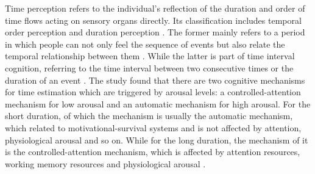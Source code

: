 \documentclass[sigconf]{acmart}
\begin{document}

Time perception refers to the individual's reflection of the duration and order of time flows acting on sensory organs directly. Its classification includes temporal order perception and duration perception \cite{宋其争2004时间认知的理论模型探析}. The former mainly refers to a period in which people can not only feel the sequence of events but also relate the temporal relationship between them \cite{张义芳2011时间知觉的影响因素研究综述}. While the latter is part of time interval cognition, referring to the time interval between two consecutive times or the duration of an event \cite{赵雪2012时距知觉研究综述}. The study found that there are two cognitive mechanisms for time estimation which are triggered by arousal levels: a controlled-attention mechanism for low arousal and an automatic mechanism for high arousal. For the short duration, of which the mechanism is usually the  automatic mechanism, which related to motivational-survival systems and is not affected by attention, physiological arousal and so on. While for the long duration, the mechanism of it is the controlled-attention mechanism, which is affected by attention resources, working memory resources and physiological arousal \cite{张志杰2006不同时距加工机制的比较}.

\end{document}
